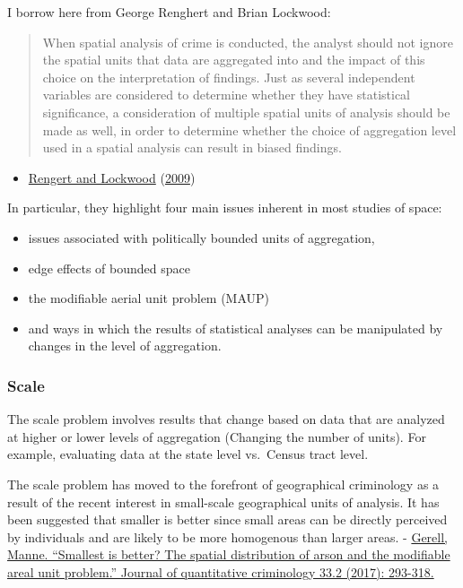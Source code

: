 \documentclass[
]{book}
\providecommand{\tightlist}{%
  \setlength{\itemsep}{0pt}\setlength{\parskip}{0pt}}
\begin{document}
I borrow here from George Renghert and Brian Lockwood:

\begin{quote}
When spatial analysis of crime is conducted, the analyst should not ignore the spatial units that data are aggregated into and the impact of this choice on the interpretation of findings. Just as several independent variables are considered to determine whether they have statistical significance, a consideration of multiple spatial units of analysis should be made as well, in order to determine whether the choice of aggregation level used in a spatial analysis can result in biased findings.
\end{quote}

\begin{itemize}
\tightlist
\item
  \protect\hyperlink{ref-Rengert_2009}{Rengert and Lockwood} (\protect\hyperlink{ref-Rengert_2009}{2009})
\end{itemize}

In particular, they highlight four main issues inherent in most studies of space:

\begin{itemize}
\tightlist
\item
  issues associated with politically bounded units of aggregation,
\item
  edge effects of bounded space
\item
  the modifiable aerial unit problem (MAUP)
\item
  and ways in which the results of statistical analyses can be manipulated by changes in the level of
  aggregation.
\end{itemize}

\hypertarget{scale}{%
\subsubsection{Scale}\label{scale}}

The scale problem involves results that change based on data that are analyzed at higher or lower levels of aggregation (Changing the number of units). For example, evaluating data at the state level vs.~Census tract level.

The scale problem has moved to the forefront of geographical criminology as a result of the recent interest in small-scale geographical units of analysis. It has been suggested that smaller is better since small areas can be directly perceived by individuals and are likely to be more homogenous than larger areas.
- \href{https://link.springer.com/article/10.1007/s10940-016-9297-6}{Gerell, Manne. ``Smallest is better? The spatial distribution of arson and the modifiable areal unit problem.'' Journal of quantitative criminology 33.2 (2017): 293-318.}
\end{document}

